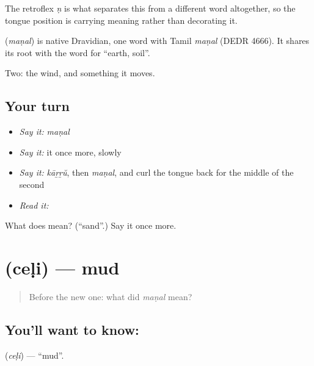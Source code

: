 The retroflex \emph{ṇ} is what separates this from a different word altogether, so the tongue position is carrying meaning rather than decorating it.

\begin{cousinweb}
\textbf{} (\emph{maṇal}) is native Dravidian, one word with Tamil \emph{maṇal} (DEDR 4666). It shares its root with the word for \textquotedblleft{}earth, soil\textquotedblright{}.
\end{cousinweb}

\begin{grammarlens}[title={What you've built}]
Two: the wind, and something it moves.
\end{grammarlens}

\subsection*{Your turn}
\begin{itemize}
\raggedright
  \item \emph{Say it:} \emph{maṇal}
  \item \emph{Say it:} it once more, slowly
  \item \emph{Say it:} \emph{kāṟṟŭ}, then \emph{maṇal}, and curl the tongue back for the middle of the second
  \item \emph{Read it:} \textbf{}
\end{itemize}

\begin{tcolorbox}[breakable,colback=teal!4,colframe=teal!35!black,title={Before you move on}]
What does  mean? (\textquotedblleft{}sand\textquotedblright{}.) Say it once more.
\end{tcolorbox}
\section[\texorpdfstring{\ml{ചെളി} (ceḷi)}{ചെളി (ceḷi)}]{ (ceḷi) — mud}

\label{lesson:ML-C59-mud}



\begin{quote}
Before the new one: what did \emph{maṇal} mean?
\end{quote}

\subsection*{You'll want to know: }
\textbf{} (\emph{ceḷi}) — \textquotedblleft{}mud\textquotedblright{}.


